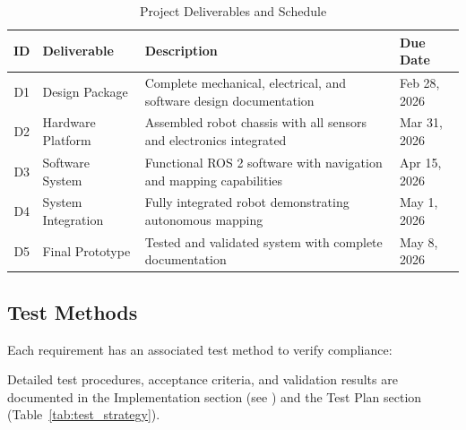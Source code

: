\begin{table}[H]
\centering
\caption{Project Deliverables and Schedule}
\label{tab:deliverables}
\begin{tabular}{@{}clp{}l@{}}
\toprule
\textbf{ID} & \textbf{Deliverable} & \textbf{Description} & \textbf{Due Date} \\
\midrule
D1 & Design Package & Complete mechanical, electrical, and software design documentation & Feb 28, 2026 \\
\addlinespace
D2 & Hardware Platform & Assembled robot chassis with all sensors and electronics integrated & Mar 31, 2026 \\
\addlinespace
D3 & Software System & Functional ROS 2 software with navigation and mapping capabilities & Apr 15, 2026 \\
\addlinespace
D4 & System Integration & Fully integrated robot demonstrating autonomous mapping & May 1, 2026 \\
\addlinespace
D5 & Final Prototype & Tested and validated system with complete documentation & May 8, 2026 \\
\bottomrule
\end{tabular}
\end{table}

\subsection{Test Methods}

Each requirement has an associated test method to verify compliance:

Detailed test procedures, acceptance criteria, and validation results are documented in the Implementation section (see ) and the Test Plan section (Table~\ref{tab:test_strategy}).

